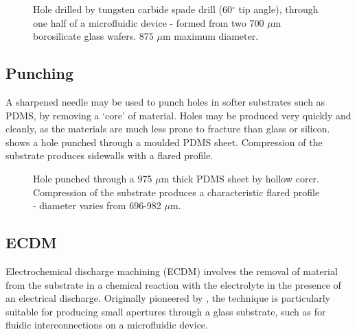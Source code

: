 \begin{figure}
\centering
{}
\caption[Hole drilled through glass substrate by spade drill.]{Hole drilled by tungsten carbide spade drill (60$^{\circ}$ tip angle), through one half of a microfluidic device - formed from two 700 $\mu$m borosilicate glass wafers. 875 $\mu$m maximum diameter.}
\label{fig:spade_drilling_holes}
\end{figure}

\subsection{Punching}
\label{Section:Punching_pdms}

A sharpened needle may be used to punch holes in softer substrates such as PDMS, by removing a `core' of material. Holes may be produced very quickly and cleanly, as the materials are much less prone to fracture than glass or silicon.  shows a hole punched through a moulded PDMS sheet. Compression of the substrate produces sidewalls with a flared profile.

\begin{figure}
\centering
{}
\caption[Hole punched through PDMS sheet by hollow corer.]{Hole punched through a 975 $\mu$m thick PDMS sheet by hollow corer. Compression of the substrate produces a characteristic flared profile - diameter varies from 696-982 $\mu$m.}
\label{fig:pdms_punched_holes}
\end{figure}


\subsection{ECDM}
\label{Section:ECDM}
Electrochemical discharge machining (ECDM) involves the removal of material from the substrate in a chemical reaction with the electrolyte in the presence of an electrical discharge. Originally pioneered by \cite{Kurafugi:1968}, the technique is particularly suitable for producing small apertures through a glass substrate, such as for fluidic interconnections on a microfluidic device.


